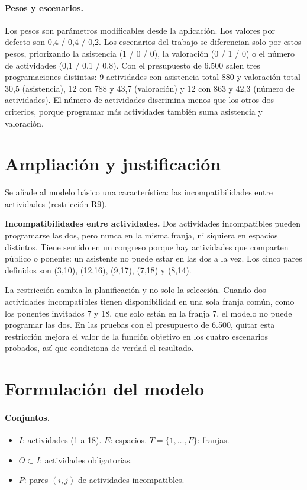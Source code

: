 \paragraph{Pesos y escenarios.} Los pesos son par\'ametros modificables desde la aplicaci\'on. Los valores por defecto son 0,4 / 0,4 / 0,2. Los escenarios del trabajo se diferencian solo por estos pesos, priorizando la asistencia (1 / 0 / 0), la valoraci\'on (0 / 1 / 0) o el n\'umero de actividades (0,1 / 0,1 / 0,8). Con el presupuesto de 6.500 salen tres programaciones distintas: 9 actividades con asistencia total 880 y valoraci\'on total 30,5 (asistencia), 12 con 788 y 43,7 (valoraci\'on) y 12 con 863 y 42,3 (n\'umero de actividades). El n\'umero de actividades discrimina menos que los otros dos criterios, porque programar m\'as actividades tambi\'en suma asistencia y valoraci\'on.

\section{Ampliaci\'on y justificaci\'on}
Se a\~nade al modelo b\'asico una caracter\'istica: las incompatibilidades entre actividades (restricci\'on R9).

\textbf{Incompatibilidades entre actividades.} Dos actividades incompatibles pueden programarse las dos, pero nunca en la misma franja, ni siquiera en espacios distintos. Tiene sentido en un congreso porque hay actividades que comparten p\'ublico o ponente: un asistente no puede estar en las dos a la vez. Los cinco pares definidos son (3,10), (12,16), (9,17), (7,18) y (8,14).

La restricci\'on cambia la planificaci\'on y no solo la selecci\'on. Cuando dos actividades incompatibles tienen disponibilidad en una sola franja com\'un, como los ponentes invitados 7 y 18, que solo est\'an en la franja 7, el modelo no puede programar las dos. En las pruebas con el presupuesto de 6.500, quitar esta restricci\'on mejora el valor de la funci\'on objetivo en los cuatro escenarios probados, as\'i que condiciona de verdad el resultado.

\section{Formulaci\'on del modelo}
\paragraph{Conjuntos.}
\begin{itemize}[nosep]
\item $I$: actividades (1 a 18). $E$: espacios. $T=\{1,\dots,F\}$: franjas.
\item $O\subset I$: actividades obligatorias.
\item $P$: pares $(i,j)$ de actividades incompatibles.
\end{itemize}
